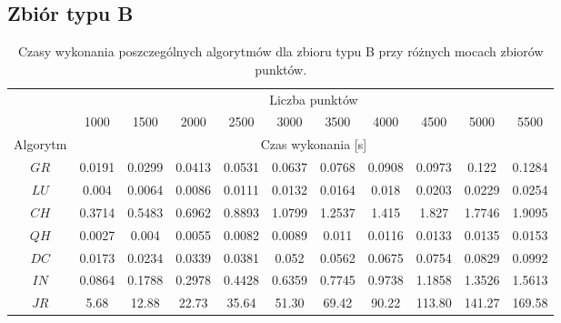 \documentclass[11pt]{article}
\theoremstyle{remark} \newtheorem{definition}{def.}
\theoremstyle{definition} \newtheorem{twierdzenie}{tw.}
\begin{document}
\subsection{Zbiór typu B}


\begin{table}[]
\centering
\caption{Czasy wykonania poszczególnych algorytmów dla zbioru typu B przy różnych mocach zbiorów punktów. }
\label{tab:okrag}
\begin{tabular}{c|c|c|c|c|c|c|c|c|c|c|}
\cline{2-11}
\multicolumn{1}{l|}{} & \multicolumn{10}{c|}{Liczba punktów} \\ \cline{2-11} 
\multicolumn{1}{l|}{} & 1000 & 1500 & 2000 & 2500 & 3000 & 3500 & 4000 & 4500 & 5000 & 5500 \\ \hline
\multicolumn{1}{|c|}{Algorytm} & \multicolumn{10}{c|}{Czas wykonania {[}s{]}} \\ \hline
\multicolumn{1}{|c|}{$GR$} & 0.0191 & 0.0299 & 0.0413 & 0.0531 & 0.0637 & 0.0768 & 0.0908 & 0.0973 & 0.122 & 0.1284 \\ \hline
\multicolumn{1}{|c|}{$LU$} & 0.004 & 0.0064 & 0.0086 & 0.0111 & 0.0132 & 0.0164 & 0.018 & 0.0203 & 0.0229 & 0.0254 \\ \hline
\multicolumn{1}{|c|}{$CH$} & 0.3714 & 0.5483 & 0.6962 & 0.8893 & 1.0799 & 1.2537 & 1.415 & 1.827 & 1.7746 & 1.9095 \\ \hline
\multicolumn{1}{|c|}{$QH$} & 0.0027 & 0.004 & 0.0055 & 0.0082 & 0.0089 & 0.011 & 0.0116 & 0.0133 & 0.0135 & 0.0153 \\ \hline
\multicolumn{1}{|c|}{$DC$} & 0.0173 & 0.0234 & 0.0339 & 0.0381 & 0.052 & 0.0562 & 0.0675 & 0.0754 & 0.0829 & 0.0992 \\ \hline
\multicolumn{1}{|c|}{$IN$} & 0.0864 & 0.1788 & 0.2978 & 0.4428 & 0.6359 & 0.7745 & 0.9738 & 1.1858 & 1.3526 & 1.5613 \\ \hline
\multicolumn{1}{|c|}{$JR$} & 5.68 & 12.88 & 22.73 & 35.64 & 51.30 & 69.42 & 90.22 & 113.80 & 141.27 & 169.58 \\ \hline
\end{tabular}
\end{table}
\end{document}

